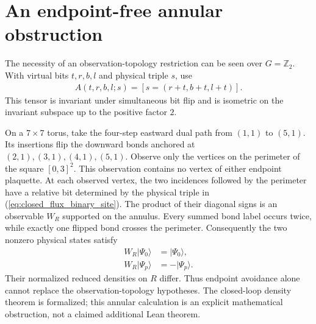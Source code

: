 \documentclass{article}
\begin{document}
\section{An endpoint-free annular obstruction}
The necessity of an observation-topology restriction can be seen over
$G=\mathbb Z_2$. With virtual bits $t,r,b,l$ and physical triple $s$, use
\begin{align}
    A(t,r,b,l;s)=[s=(r+t,b+t,l+t)].
    \label{eq:closed_flux_binary_site}
\end{align}
This tensor is invariant under simultaneous bit flip and is isometric on
the invariant subspace up to the positive factor $2$.

On a $7\times7$ torus, take the four-step eastward dual path from $(1,1)$
to $(5,1)$. Its insertions flip the downward bonds anchored at
$(2,1),(3,1),(4,1),(5,1)$. Observe only the vertices on the perimeter of
the square $[0,3]^2$. This observation contains no vertex of either endpoint
plaquette. At each observed vertex, the two incidences followed by the
perimeter have a relative bit determined by the physical triple in
(\ref{eq:closed_flux_binary_site}). The product of their diagonal signs is
an observable $W_R$ supported on the annulus. Every summed bond label
occurs twice, while exactly one flipped bond crosses the perimeter.
Consequently the two nonzero physical states satisfy
\begin{align}
    W_R\lvert\Psi_0\rangle & =\lvert\Psi_0\rangle, \\
    W_R\lvert\Psi_p\rangle & =-\lvert\Psi_p\rangle.
    \label{eq:closed_flux_annular_sign}
\end{align}
Their normalized reduced densities on $R$ differ. Thus endpoint avoidance
alone cannot replace the observation-topology hypotheses. The closed-loop
density theorem is formalized; this annular calculation is an explicit
mathematical obstruction, not a claimed additional Lean theorem.


\end{document}
